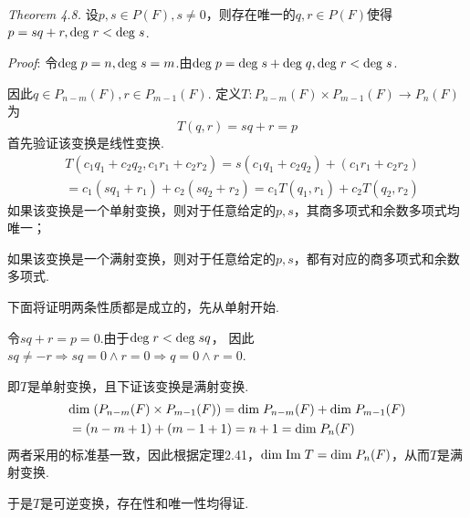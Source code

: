 \textit{Theorem 4.8.}
设$p,s \in P(F),s \ne 0$，则存在唯一的$q,r \in P(F)$使得$p=sq+r,\mathrm{deg \;} r < \mathrm{deg \;} s$.

\textit{Proof}:
令$\mathrm{deg \;} p=n,\mathrm{deg \;} s=m$.由$\mathrm{deg \;} p=\mathrm{deg \;} s+\mathrm{deg \;} q,\mathrm{deg \;} r < \mathrm{deg \;} s$.

因此$q \in P_{n-m}(F),r \in P_{m-1}(F)$.
定义$T:P_{n-m}(F) \times P_{m-1}(F) \rightarrow P_{n}(F)$为 
    \begin{equation*}
        T(q,r)=sq+r=p
    \end{equation*}
首先验证该变换是线性变换.
    \begin{align*}
        &T(c_1q_1+c_2q_2,c_1r_1+c_2r_2)=s(c_1q_1+c_2q_2)+(c_1r_1+c_2r_2) \\
        &=c_1(sq_1+r_1)+c_2(sq_2+r_2)=c_1T(q_1,r_1)+c_2T(q_2,r_2)
    \end{align*}
如果该变换是一个单射变换，则对于任意给定的$p,s$，其商多项式和余数多项式均唯一；

如果该变换是一个满射变换，则对于任意给定的$p,s$，都有对应的商多项式和余数多项式.

下面将证明两条性质都是成立的，先从单射开始.

令$sq+r=p=0$.由于$\mathrm{deg \;} r < \mathrm{deg \;} sq$，
因此$sq \ne -r \Rightarrow sq=0 \wedge r=0 \Rightarrow q=0 \wedge r=0$.

即$T$是单射变换，且下证该变换是满射变换.
    \begin{align*}
        &\mathrm{dim \;} (P_{n-m}(F) \times P_{m-1}(F))=\mathrm{dim \;} P_{n-m}(F)+\mathrm{dim \;} P_{m-1}(F) \\
        &=(n-m+1)+(m-1+1)=n+1=\mathrm{dim \;} P_n(F)
    \end{align*}
两者采用的标准基一致，因此根据定理2.41，$\mathrm{dim \;} \mathrm{Im \;} T=\mathrm{dim \;}  P_n(F)$，从而$T$是满射变换.

于是$T$是可逆变换，存在性和唯一性均得证.

